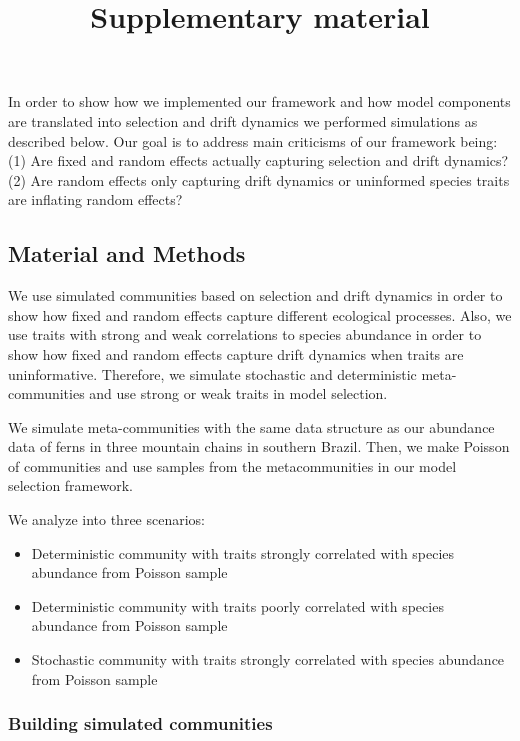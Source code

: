 \title{Supplementary material}
\author{}
\date{}


\maketitle

In order to show how we implemented our framework and how model
components are translated into selection and drift dynamics we performed
simulations as described below. Our goal is to address main criticisms
of our framework being: (1) Are fixed and random effects actually
capturing selection and drift dynamics? (2) Are random effects only
capturing drift dynamics or uninformed species traits are inflating
random effects?

\subsection*{Material and Methods}\label{material-and-methods}

We use simulated communities based on selection and drift dynamics in
order to show how fixed and random effects capture different ecological
processes. Also, we use traits with strong and weak correlations to
species abundance in order to show how fixed and random effects capture
drift dynamics when traits are uninformative. Therefore, we simulate
stochastic and deterministic meta-communities and use strong or weak
traits in model selection.

We simulate meta-communities with the same data structure as our
abundance data of ferns in three mountain chains in southern Brazil.
Then, we make Poisson of communities and use samples from the
metacommunities in our model selection framework.

We analyze into three scenarios:

\begin{itemize}
\tightlist
\item
  Deterministic community with traits strongly correlated with species abundance from Poisson sample
\item
  Deterministic community with traits poorly correlated with species abundance from Poisson sample
\item
  Stochastic community with traits strongly correlated with species abundance from Poisson sample
\end{itemize}

\subsubsection*{Building simulated
communities}\label{building-simulated-communities}

